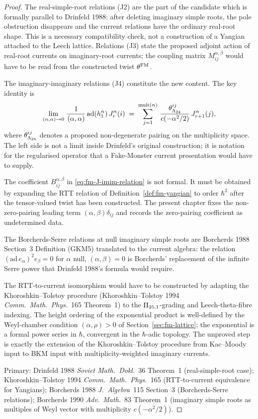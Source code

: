 \begin{proof}
The real-simple-root relations (J2) are the part of the candidate which is formally parallel to Drinfeld 1988: after deleting imaginary simple roots, the pole obstruction disappears and the current relations have the ordinary real-root shape. This is a necessary compatibility check, not a construction of a Yangian attached to the Leech lattice. Relations (J3) state the proposed adjoint action of real-root currents on imaginary-root currents; the coupling matrix $M^{\alpha,\beta}_{ij}$ would have to be read from the constructed twist $\theta^{\mathrm{FM}}$.

The imaginary-imaginary relations (J4) constitute the new content. The key identity is
\begin{equation}
\label{eq:fm-J-mult-regularisation}
 \lim_{(\alpha, \alpha) \to 0}\,\frac{1}{(\alpha, \alpha)}\,\mathrm{ad}(h^\alpha_1)\,J^\alpha_r(i)
 \;=\;
 \sum_{j=1}^{\mathrm{mult}(\alpha)}\,\frac{\theta_{\Lambda_{24}}^{ij}}{c(-\alpha^2/2)}\,J^\alpha_{r+1}(j),
\end{equation}
where $\theta_{\Lambda_{24}}^{ij}$ denotes a proposed non-degenerate pairing on
the multiplicity space. The left side is not a limit inside Drinfeld's
original construction; it is notation for the regularised operator that
a Fake-Monster current presentation would have to supply.

The coefficient $B^{\alpha,\beta}_{ij}$ in
\eqref{eq:fm-J-imim-relation} is not formal. It must be obtained
by expanding the RTT relation of Definition~\ref{def:fm-yangian} to
order $\hbar^2$ after the tensor-valued twist has been constructed. The
present chapter fixes the non-zero-pairing leading term
$(\alpha,\beta)\delta_{ij}$ and records the zero-pairing coefficient as
undetermined data.

The Borcherds-Serre relations at null imaginary simple roots are Borcherds 1988 Section~3 Definition (GKM5) translated to the current algebra: the relation $(\mathrm{ad}\, e_\alpha)^2 e_\beta = 0$ for $\alpha$ null, $(\alpha, \beta) = 0$ is Borcherds' replacement of the infinite Serre power that Drinfeld 1988's formula would require.

The RTT-to-current isomorphism would have to be constructed by adapting the Khoroshkin--Tolstoy procedure (Khoroshkin--Tolstoy 1994 \emph{Comm.~Math.~Phys.}~165 Theorem~1) to the $\mathrm{II}_{25,1}$-grading and Leech-theta-fibre indexing. The height ordering of the exponential product is well-defined by the Weyl-chamber condition $(\alpha, \rho) > 0$ of Section~\ref{sec:fm-lattice}; the exponential is a formal power series in $\hbar$, convergent in the $\hbar$-adic topology. The unproved step is exactly the extension of the Khoroshkin--Tolstoy procedure from Kac--Moody input to BKM input with multiplicity-weighted imaginary currents.

Primary: Drinfeld 1988 \emph{Soviet Math.~Dokl.}~36 Theorem~1 (real-simple-root case); Khoroshkin--Tolstoy 1994 \emph{Comm.~Math.~Phys.}~165 (RTT-to-current equivalence for Yangians); Borcherds 1988 \emph{J.~Algebra}~115 Section~3 (Borcherds-Serre relations); Borcherds 1990 \emph{Adv.~Math.}~83 Theorem~1 (imaginary simple roots as multiples of Weyl vector with multiplicity $c(-\alpha^2/2)$).
\end{proof}

